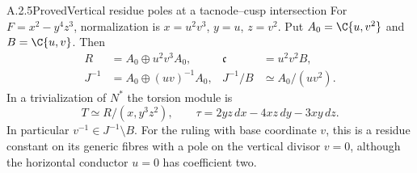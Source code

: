 \begin{statement}{A.2.5}{Proved}{Vertical residue poles at a tacnode--cusp intersection}
For $F=x^2-y^4z^3$, normalization is $x=u^2v^3$, $y=u$, $z=v^2$. Put $A_0=\C\{u,v^2\}$ and $B=\C\{u,v\}$. Then
\[
 \begin{aligned}
 R&=A_0\oplus u^2v^3A_0,&\mathfrak c&=u^2v^2B,\\
 J^{-1}&=A_0\oplus(uv)^{-1}A_0,&
 J^{-1}/B&\simeq A_0/(uv^2).
 \end{aligned}
 \tag{A.9a}
\]
In a trivialization of $N^*$ the torsion module is
\[
 T\simeq R/(x,y^3z^2),\qquad
 \tau=2yz\,dx-4xz\,dy-3xy\,dz.
 \tag{A.9b}
\]
In particular $v^{-1}\in J^{-1}\setminus B$. For the ruling with base coordinate $v$, this is a residue constant on its generic fibres with a pole on the vertical divisor $v=0$, although the horizontal conductor $u=0$ has coefficient two.
\end{statement}
